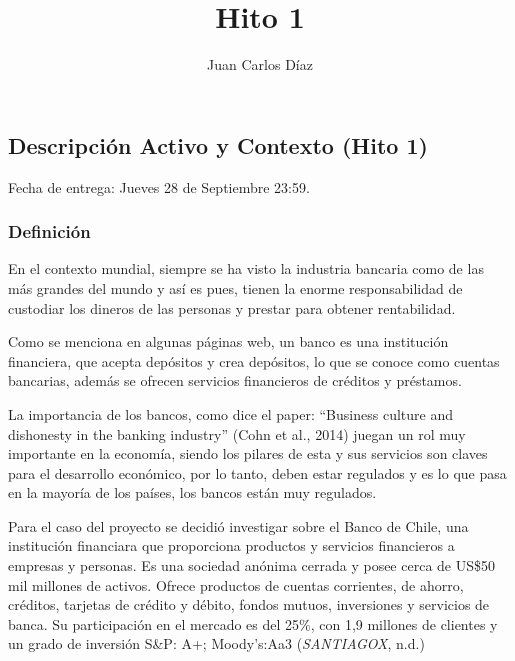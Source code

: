 \documentclass[
  letterpaper,
  DIV=11,
  numbers=noendperiod]{scrartcl}
\title{Hito 1}
\author{Juan Carlos Díaz}
\date{}
\begin{document}
\maketitle
\ifdefined\Shaded\renewenvironment{Shaded}{\begin{tcolorbox}[interior hidden, boxrule=0pt, borderline west={3pt}{0pt}{shadecolor}, sharp corners, enhanced, breakable, frame hidden]}{\end{tcolorbox}}\fi

\hypertarget{descripciuxf3n-activo-y-contexto-hito-1}{%
\subsection{Descripción Activo y Contexto (Hito
1)}\label{descripciuxf3n-activo-y-contexto-hito-1}}

Fecha de entrega: Jueves 28 de Septiembre 23:59.

\hypertarget{definiciuxf3n}{%
\subsubsection{Definición}\label{definiciuxf3n}}

En el contexto mundial, siempre se ha visto la industria bancaria como
de las más grandes del mundo y así es pues, tienen la enorme
responsabilidad de custodiar los dineros de las personas y prestar para
obtener rentabilidad.

Como se menciona en algunas páginas web, un banco es una institución
financiera, que acepta depósitos y crea depósitos, lo que se conoce como
cuentas bancarias, además se ofrecen servicios financieros de créditos y
préstamos.

La importancia de los bancos, como dice el paper: ``Business culture and
dishonesty in the banking industry'' (Cohn et al., 2014) juegan un rol
muy importante en la economía, siendo los pilares de esta y sus
servicios son claves para el desarrollo económico, por lo tanto, deben
estar regulados y es lo que pasa en la mayoría de los países, los bancos
están muy regulados.

Para el caso del proyecto se decidió investigar sobre el Banco de Chile,
una institución financiara que proporciona productos y servicios
financieros a empresas y personas. Es una sociedad anónima cerrada y
posee cerca de US\$50 mil millones de activos. Ofrece productos de
cuentas corrientes, de ahorro, créditos, tarjetas de crédito y débito,
fondos mutuos, inversiones y servicios de banca. Su participación en el
mercado es del 25\%, con 1,9 millones de clientes y un grado de
inversión S\&P: A+; Moody's:Aa3 (\emph{SANTIAGOX}, n.d.)
\end{document}
